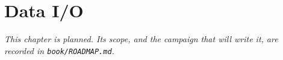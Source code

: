 \chapter{Data I/O}
\label{ch:dataio}

\emph{This chapter is planned. Its scope, and the campaign that will write
it, are recorded in \texttt{book/ROADMAP.md}.}
